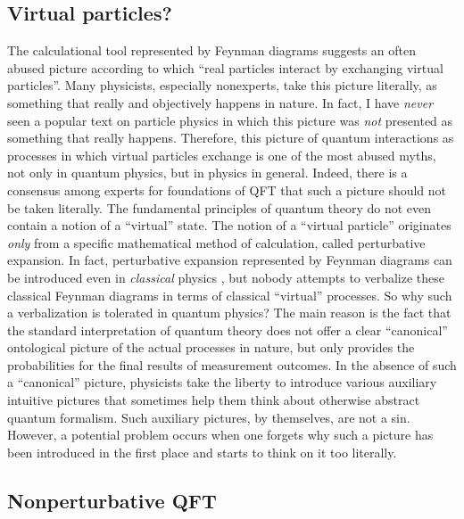\documentclass[12pt]{article}
\begin{document}
\subsection{Virtual particles?}

The calculational tool represented by Feynman diagrams  
suggests an often abused picture according to which
``real particles interact by exchanging virtual particles''.
Many physicists, especially nonexperts,
take this picture literally, as something that 
really and objectively happens in nature. In fact, I have 
{\em never} seen 
a popular text on particle physics in which this picture was 
{\em not} presented as something that really happens.
Therefore, this picture of quantum interactions as processes  
in which virtual particles exchange is one of the 
most abused myths, not only in quantum physics, but in 
physics in general. Indeed, there is a consensus among experts 
for foundations of QFT that such a picture should
not be taken literally. The fundamental principles 
of quantum theory do not even contain a notion of a
``virtual'' state. The notion of a 
``virtual particle'' originates {\em only} from a 
specific mathematical method of calculation, called perturbative 
expansion. In fact, perturbative expansion 
represented by Feynman diagrams can be introduced even in 
{\em classical} physics \cite{thorn,penco}, but nobody 
attempts to verbalize these classical Feynman diagrams 
in terms of classical ``virtual'' processes.  
So why such a verbalization is tolerated in quantum physics?
The main reason is the fact that the standard interpretation 
of quantum theory does not offer a clear ``canonical'' ontological picture 
of the actual processes in nature, but only provides 
the probabilities for the final results of measurement outcomes.
In the absence of such a ``canonical'' picture, 
physicists take the liberty to introduce 
various auxiliary intuitive pictures that sometimes help them 
think about otherwise abstract quantum formalism. Such auxiliary
pictures, by themselves, are not a sin. However, a potential 
problem occurs when one forgets why such a picture has been introduced 
in the first place and starts to think on it too literally.   

\subsection{Nonperturbative QFT}
\end{document}
